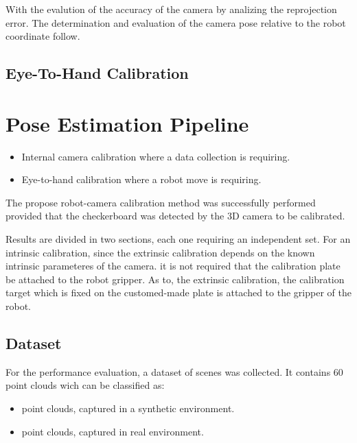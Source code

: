 With the evalution of the accuracy of the camera by analizing the reprojection error. The determination and evaluation of the camera pose relative to the robot coordinate follow.

\subsection{Eye-To-Hand Calibration}






\section{Pose Estimation Pipeline}
\iffalse



\begin{itemize}
\item Internal camera calibration where a data collection is requiring.
\item Eye-to-hand calibration where a robot move is requiring. 
\end{itemize}

The propose robot-camera calibration method was successfully performed provided that the checkerboard was detected by the 3D camera to be calibrated.


 Results are divided in two sections, each one requiring an independent set. For an intrinsic calibration, since the extrinsic calibration depends on the known intrinsic parameteres of the camera.  it is not required that the calibration plate be attached to the robot gripper. As to, the extrinsic calibration, the calibration target which is fixed on the customed-made plate is attached to the gripper of the robot.



\subsection{Dataset}

For the performance evaluation, a dataset of scenes was collected. It contains 60 point clouds wich can be classified as:
\begin{itemize}
\item point clouds, captured in a synthetic environment.
\item point clouds, captured in real environment. 
\end{itemize}

